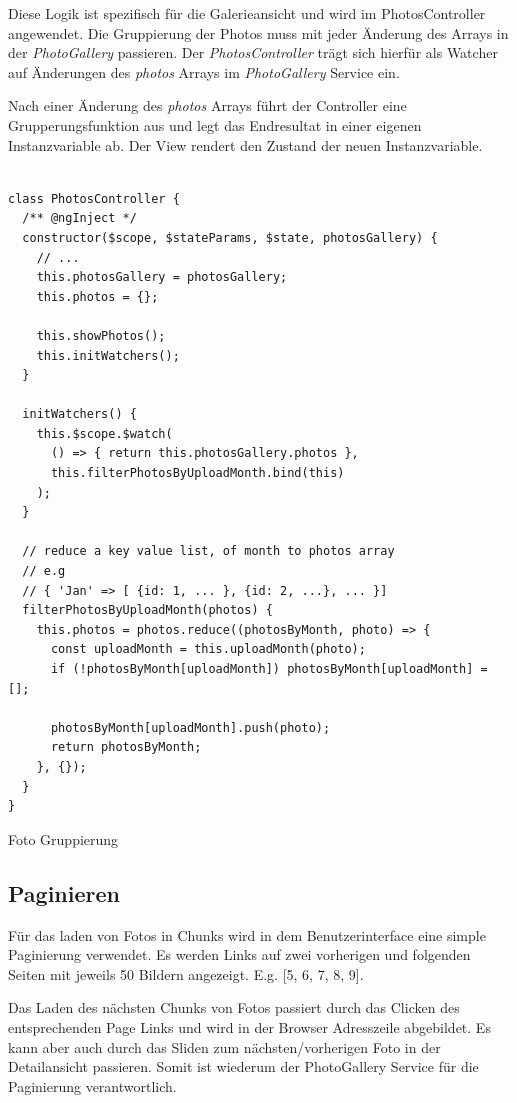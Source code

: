 Diese Logik ist spezifisch für die Galerieansicht und wird im PhotosController angewendet. Die Gruppierung der Photos muss mit jeder Änderung des Arrays in der \textit{PhotoGallery} passieren. Der \textit{PhotosController} trägt sich hierfür als Watcher auf Änderungen des \textit{photos} Arrays im \textit{PhotoGallery} Service ein. 

Nach einer Änderung des \textit{photos} Arrays führt der Controller eine Grupperungsfunktion aus und legt das Endresultat in einer eigenen Instanzvariable ab. Der View rendert den Zustand der neuen Instanzvariable.

\begin{listing}[H]
\begin{verbatim}

class PhotosController {
  /** @ngInject */
  constructor($scope, $stateParams, $state, photosGallery) {
    // ...
    this.photosGallery = photosGallery;
    this.photos = {};

    this.showPhotos();
    this.initWatchers();
  }

  initWatchers() {
    this.$scope.$watch(
      () => { return this.photosGallery.photos }, 
      this.filterPhotosByUploadMonth.bind(this)
    );
  }

  // reduce a key value list, of month to photos array
  // e.g
  // { 'Jan' => [ {id: 1, ... }, {id: 2, ...}, ... }]
  filterPhotosByUploadMonth(photos) {
    this.photos = photos.reduce((photosByMonth, photo) => {
      const uploadMonth = this.uploadMonth(photo);
      if (!photosByMonth[uploadMonth]) photosByMonth[uploadMonth] = [];

      photosByMonth[uploadMonth].push(photo);
      return photosByMonth;
    }, {});
  }
}

\end{verbatim}
\caption{Foto Gruppierung}
\label{lst:photo_group}
\end{listing} 

\subsection{Paginieren}

Für das laden von Fotos in Chunks wird in dem Benutzerinterface eine simple Paginierung verwendet. Es werden Links auf zwei vorherigen und folgenden Seiten mit jeweils 50 Bildern angezeigt. E.g. [5, 6, 7, 8, 9]. 

Das Laden des nächsten Chunks von Fotos passiert durch das Clicken des entsprechenden Page Links und wird in der Browser Adresszeile abgebildet. Es kann aber auch durch das Sliden zum nächsten/vorherigen Foto in der Detailansicht passieren. Somit ist wiederum der PhotoGallery Service für die Paginierung verantwortlich.

